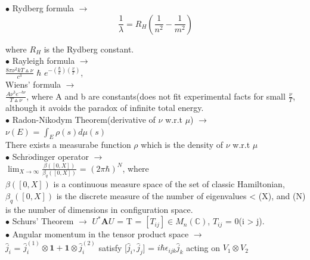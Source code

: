 \documentclass[a4paper, 10pt, onepage]{elegantbook}
\begin{document}
{$\bullet$ Rydberg formula $\longrightarrow$\\
\begin{equation}
\frac{1}{\lambda} = R_H \left({\frac{1}{n^2} - \frac{1}{m^2}} \right)
\end{equation}

where $R_H$ is the Rydberg constant.  \\


$\bullet$ Rayleigh formula $\longrightarrow$  \\ 

 $\frac{8\pi\nu^2{kT}\vartriangle\nu}{c^3}$ $\hbar$ $e^{-\left(\frac{\hbar}{k}\right) \left(\frac{\nu}{T} \right)}$,  \\

Wiens' formula $\longrightarrow$ \\

$\frac{A \nu^3 e^{-b \nu}}{T \vartriangle \nu}$, where A and b are constants(does not fit experimental facts for small $\frac{ \nu}{T}$, although it avoids the paradox of infinite total energy.  \\


$\bullet$ Radon-Nikodym Theorem(derivative of $\nu$ w.r.t $\mu$) $\longrightarrow$  \\

$\nu (E)$ = $\int_E \rho(s) d\mu(s)$ \\
There exists a measurabe function $\rho$ which is the density of $\nu$ w.r.t $\mu$ \\

$\bullet$ Schr$\ddot{o}$dinger operator $\longrightarrow$  \\ 

$\lim_{X \to \infty} \frac{\beta([0,X])}{\beta_q([0,X])}$ = $(2 \pi \hbar)^N$, where \\

$\beta([0,X])$ is a continuous measure space of the set of classic Hamiltonian, $\beta_q([0,X])$ is the discrete
measure of the number of eigenvalues < (X), and (N) is the number of dimensions in configuration space.  \\

$\bullet$ Schurs' Theorem $\longrightarrow$ $U^*{\mathbf A}U$ = T = $[T_{ij}] \in M_n(\mathbb C)$, $T_{ij}$ = 0(i > j). \\

$\bullet$ Angular momentum in the tensor product space $\longrightarrow$  \\

$\hat j_i$ = ${\hat j_i^{(1)}} \otimes \mathbf{1} + \mathbf{1} \otimes  {\hat j_i^{(2)}}$  satisfy [$\hat j_i, \hat j_j$] = ${i \hbar \epsilon_{ijk} {\hat j_k}}$ acting on $V_1 \otimes V_2$ \\

}
\end{document}
